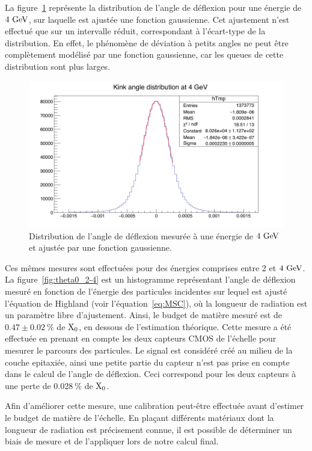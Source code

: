   La figure~\ref{fig:angleX0} représente la distribution de l'angle de déflexion pour une énergie de $4~\rm{GeV}$, sur laquelle est ajustée une fonction gaussienne.
  Cet ajustement n'est effectué que sur un intervalle réduit, correspondant à l'écart-type de la distribution.
  En effet, le phénomène de déviation à petits angles ne peut être complètement modélisé par une fonction gaussienne, car les queues de cette distribution sont plus larges.
    
  \begin{figure}[!h]
    \centering
    \includegraphics[width = \textwidth]{Pictures/X0/kinkAngle4GeV.png}
    \caption{Distribution de l'angle de déflexion mesurée à une énergie de $4~\rm{GeV}$ et ajustée par une fonction gaussienne.}
    \label{fig:angleX0}
  \end{figure} 

  Ces mêmes mesures sont effectuées pour des énergies comprises entre 2 et $4~\rm{GeV}$.
  La figure~\ref{fig:theta0_2-4} est un histogramme représentant l'angle de déflexion mesuré en fonction de l'énergie des particules incidentes sur lequel est ajusté l'équation de Highland (voir l'équation~\ref{eq:MSC}), où la longueur de radiation est un paramètre libre d'ajustement.
  Ainsi, le budget de matière mesuré est de $0.47 \pm 0.02~\%$ de $\rm{X_0}$, en dessous de l'estimation théorique.
  Cette mesure a été effectuée en prenant en compte les deux capteurs \gls{CMOS} de l'échelle pour mesurer le parcours des particules.
  Le signal est considéré créé au milieu de la couche epitaxiée, ainsi une petite partie du capteur n'est pas prise en compte dans le calcul de l'angle de déflexion.
  Ceci correspond pour les deux capteurs à une perte de $0.028~\%$ de $\rm{X_{0}}$.

  Afin d'améliorer cette mesure, une calibration peut-être effectuée avant d'estimer le budget de matière de l'échelle.
  En plaçant différents matér\-iaux dont la longueur de radiation est précisement connue, il est possible de déterminer un biais de mesure et de l'appliquer lors de notre calcul final.

